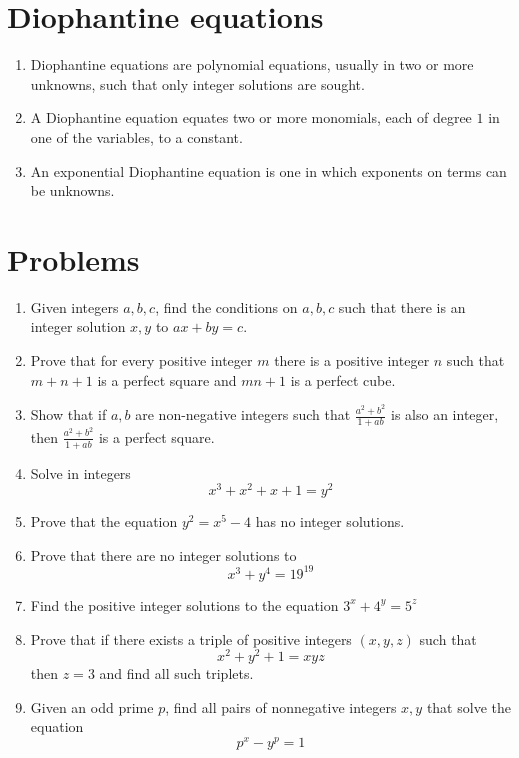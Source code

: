 \documentclass{article}
\begin{document}
	
\section*{Diophantine equations}
\begin{enumerate}
	\item 
	Diophantine equations are polynomial equations, usually in two or more unknowns, such that only integer solutions are sought.
	\item 
	A Diophantine equation equates two or more monomials, each of degree $1$ in one of the variables, to a constant.
	\item 
	An exponential Diophantine equation is one in which exponents on terms can be unknowns. 
\end{enumerate}
\section*{Problems}
\begin{enumerate}
	\item 
	Given integers $a,b,c$, find the conditions on $a,b,c$ such that there is an integer solution $x,y$ to
	$ax+by=c$.
	\item %
	Prove that for every positive integer $m$ there is a positive integer $n$ such that $m+n+1$ is a perfect square and $mn+1$ is a perfect cube.
	
	\item %
	Show that if $a,b$ are non-negative integers such that $\tfrac{a^2+b^2}{1+ab}$ is also an integer, then $\tfrac{a^2+b^2}{1+ab}$ is a perfect square.
	
	\item %
	Solve in integers
	$$x^3 +x^2 + x + 1 = y^2$$
	
	\item %
	Prove that the equation $y^2=x^5-4$ has no integer solutions.
	
	\item %
	Prove that there are no integer solutions to
	$$x^3 + y^4 = 19^{19}$$
	
	\item %
	Find the positive integer solutions to the equation
	$3^x+4^y=5^z$	
	
	\item %
	Prove that if there exists a triple of positive integers $(x,y,z)$ such that 
	$$x^2 + y^2+1 = xyz$$
	then $z=3$ and find all such triplets.
	
	\item %
	Given an odd prime $p$, find all pairs of nonnegative integers $x,y$ that solve the equation
	$$p^x - y^p =1$$
	
\end{enumerate}
\end{document}
